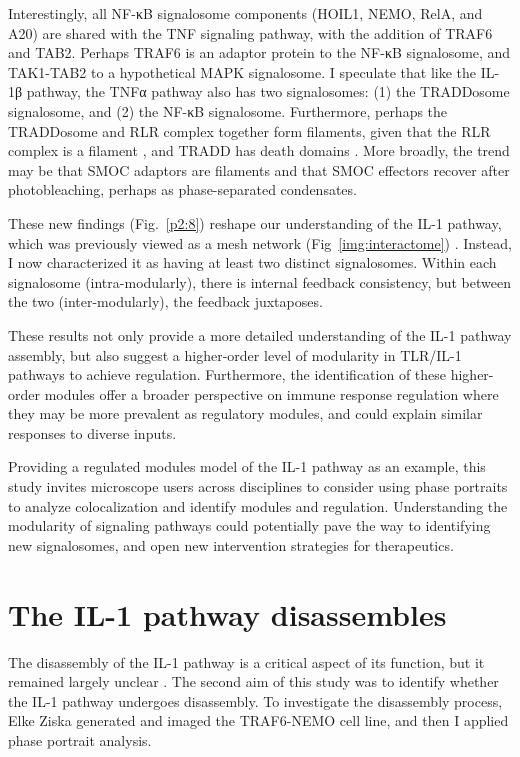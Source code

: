 Interestingly, all NF-κB signalosome components (HOIL1, NEMO, RelA, and A20) are shared with the TNF signaling pathway, with the addition of TRAF6 and TAB2. Perhaps TRAF6 is an adaptor protein to the NF-κB signalosome, and TAK1-TAB2 to a hypothetical MAPK signalosome. I speculate that like the IL-1β pathway, the TNFα pathway also has two signalosomes: (1) the TRADDosome signalosome, and (2) the NF-κB signalosome. Furthermore, perhaps the TRADDosome and RLR complex together form filaments, given that the RLR complex is a filament \autocite{Kagan_2014}, and TRADD has death domains \autocite{Michallet_2008}. More broadly, the trend may be that SMOC adaptors are filaments and that SMOC effectors recover after photobleaching, perhaps as phase-separated condensates.

These new findings (Fig.~\ref{p2:8}) reshape our understanding of the IL-1 pathway, which was previously viewed as a mesh network (Fig~\ref{img:interactome}) \autocite{Cohen_2020}\autocite{Zarrin_2021}\autocite{Zinatizadeh_2021}. Instead, I now characterized it as having at least two distinct signalosomes. Within each signalosome (intra-modularly), there is internal feedback consistency, but between the two (inter-modularly), the feedback juxtaposes.

These results not only provide a more detailed understanding of the IL-1 pathway assembly, but also suggest a higher-order level of modularity in TLR/IL-1 pathways to achieve regulation. Furthermore, the identification of these higher-order modules offer a broader perspective on immune response regulation where they may be more prevalent as regulatory modules, and could explain similar responses to diverse inputs.

Providing a regulated modules model of the IL-1 pathway as an example, this study invites microscope users across disciplines to consider using phase portraits to analyze colocalization and identify modules and regulation. Understanding the modularity of signaling pathways could potentially pave the way to identifying new signalosomes, and open new intervention strategies for therapeutics.

\section{The IL-1 pathway disassembles}
The disassembly of the IL-1 pathway is a critical aspect of its function, but it remained largely unclear \autocite{Balka_2019}. The second aim of this study was to identify whether the IL-1 pathway undergoes disassembly. To investigate the disassembly process, Elke Ziska generated and imaged the TRAF6-NEMO cell line, and then I applied phase portrait analysis.

